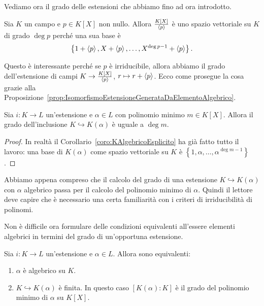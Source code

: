 Vediamo ora il grado delle estensioni che abbiamo fino ad ora introdotto.

\begin{esem}
Sia \(K\) un campo e \(p \in K[X]\) non nullo. Allora \(\frac{K[X]}{\left\langle p\right\rangle}\) è uno spazio vettoriale su \(K\) di grado \(\deg p\) perché una sua base è
\[\left\{1 + \left\langle p\right\rangle, X + \left\langle p\right\rangle, \dots{}, X^{\deg p -1} + \left\langle p\right\rangle\right\} .\]
\end{esem}

Questo è interessante perché se \(p\) è irriducibile, allora abbiamo il grado dell'estensione di campi \(K \to \frac{K[X]}{\left\langle p\right\rangle}\), \(r \mapsto r + \left\langle p\right\rangle\). Ecco come prosegue la cosa grazie alla Proposizione~\ref{prop:IsomorfismoEstensioneGenerataDaElementoAlgebrico}.

\begin{prop}\label{prop:GradoEstensioneKAlgebrico}
Sia \(i : K \to L\) un'estensione e \(\alpha \in L\) con polinomio minimo \(m \in K[X]\). Allora il grado dell'inclusione \(K \hookrightarrow K(\alpha)\) è uguale a \(\deg m\).
\end{prop}

\begin{proof}
In realtà il Corollario~\ref{coro:KAlgebricoEsplicito} ha già fatto tutto il lavoro: una base di \(K(\alpha)\) come spazio vettoriale su \(K\) è \(\left\{1, \alpha, \dots{}, \alpha^{\deg m -1}\right\}\).
\end{proof}

Abbiamo appena compreso che il calcolo del grado di una estensione \(K \hookrightarrow K(\alpha)\) con \(\alpha\) algebrico passa per il calcolo del polinomio minimo di \(\alpha\). Quindi il lettore deve capire che è necessario una certa familiarità con i criteri di irriducibilità di polinomi.

Non è difficile ora formulare delle condizioni equivalenti all'essere elementi algebrici in termini del grado di un'opportuna estensione. 

\begin{prop}
Sia \(i : K \to L\) un'estensione e \(\alpha \in L\). Allora sono equivalenti:
\begin{enumerate}
\item \(\alpha\) è algebrico su \(K\).
\item \(K \hookrightarrow K(\alpha)\) è finita. In questo caso \([K(\alpha):K]\) è il grado del polinomio minimo di \(\alpha\) su \(K[X]\).
\end{enumerate}
\end{prop}

